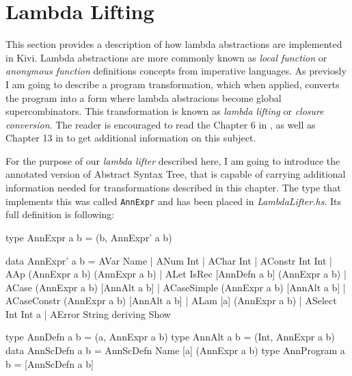 \documentclass[12pt,a4paper]{report}
\begin{document}

\section{Lambda Lifting}
\label{sec:lambda_lifting}
This section provides a description of how lambda abstractions are implemented
in Kivi. Lambda abstractions are more commonly known as \textit{local function}
or \textit{anonymous function} definitions concepts from imperative languages.
As previosly I am going to describe a program transformation, which when
applied, converts the program into a form where lambda abstracions become
global supercombinators. This transformation is known as \textit{lambda
lifting} or \textit{closure conversion}. The reader is encouraged to read the
Chapter 6 in \cite{JonLes00}, as well as Chapter 13 in \cite{Jon87} to
get additional information on this subject.

For the purpose of our \textit{lambda lifter} described here, I am going to
introduce the annotated version of Abstract Syntax Tree, that is capable of
carrying additional information needed for transformations described in this
chapter. The type that implements this was called \texttt{AnnExpr} and has
been placed in \textit{LambdaLifter.hs}. Its full definition is following:

\vspace*{0.2in}
\begin{code}[style=haskell,label=lst:annotated_expression]
type AnnExpr a b = (b, AnnExpr' a b)

data AnnExpr' a b = AVar Name
                  | ANum Int
                  | AChar Int
                  | AConstr Int Int
                  | AAp (AnnExpr a b) (AnnExpr a b)
                  | ALet IsRec [AnnDefn a b] (AnnExpr a b)
                  | ACase (AnnExpr a b) [AnnAlt a b]
                  | ACaseSimple (AnnExpr a b) [AnnAlt a b]
                  | ACaseConstr (AnnExpr a b) [AnnAlt a b]
                  | ALam [a] (AnnExpr a b)
                  | ASelect Int Int a
                  | AError String
    deriving Show

type AnnDefn a b = (a, AnnExpr a b)
type AnnAlt a b = (Int, AnnExpr a b)
data AnnScDefn a b = AnnScDefn Name [a] (AnnExpr a b)
type AnnProgram a b = [AnnScDefn a b]
\end{code}
\end{document}
